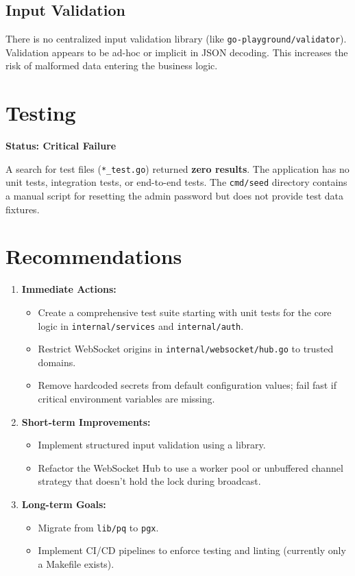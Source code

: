 \documentclass{article}
\begin{document}
\subsection{Input Validation}
There is no centralized input validation library (like \texttt{go-playground/validator}). Validation appears to be ad-hoc or implicit in JSON decoding. This increases the risk of malformed data entering the business logic.

\section{Testing}

\textbf{Status: Critical Failure}

A search for test files (\texttt{*\_test.go}) returned \textbf{zero results}. The application has no unit tests, integration tests, or end-to-end tests. The \texttt{cmd/seed} directory contains a manual script for resetting the admin password but does not provide test data fixtures.

\section{Recommendations}

\begin{enumerate}
    \item \textbf{Immediate Actions:}
    \begin{itemize}
        \item Create a comprehensive test suite starting with unit tests for the core logic in \texttt{internal/services} and \texttt{internal/auth}.
        \item Restrict WebSocket origins in \texttt{internal/websocket/hub.go} to trusted domains.
        \item Remove hardcoded secrets from default configuration values; fail fast if critical environment variables are missing.
    \end{itemize}

    \item \textbf{Short-term Improvements:}
    \begin{itemize}
        \item Implement structured input validation using a library.
        \item Refactor the WebSocket Hub to use a worker pool or unbuffered channel strategy that doesn't hold the lock during broadcast.
    \end{itemize}

    \item \textbf{Long-term Goals:}
    \begin{itemize}
        \item Migrate from \texttt{lib/pq} to \texttt{pgx}.
        \item Implement CI/CD pipelines to enforce testing and linting (currently only a Makefile exists).
    \end{itemize}
\end{enumerate}
\end{document}
